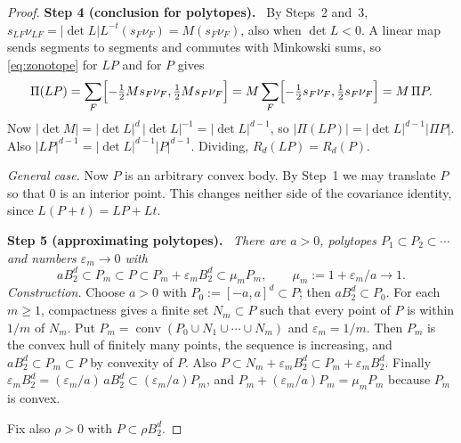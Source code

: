 \documentclass[11pt]{article}
\DeclareMathOperator{\conv}{conv}
\newcommand{\step}[1]{\par\smallskip\noindent\textbf{#1}\ }
\begin{document}
\begin{proof}
\step{Step 4 (conclusion for polytopes).} By Steps~2 and~3,
\(s_{LF}\nu_{LF}=|\det L|L^{-t}(s_F\nu_F)=M(s_F\nu_F)\), also when
\(\det L<0\). A linear map sends segments to segments and commutes with
Minkowski sums, so \eqref{eq:zonotope} for \(LP\) and for \(P\) gives
\[
 \Pi(LP)=\sum_F\Bigl[-\tfrac12Ms_F\nu_F,\tfrac12Ms_F\nu_F\Bigr]
 =M\sum_F\Bigl[-\tfrac12s_F\nu_F,\tfrac12s_F\nu_F\Bigr]=M\,\Pi P.
\]
Now \(|\det M|=|\det L|^d\,|\det L|^{-1}=|\det L|^{d-1}\), so
\(|\Pi(LP)|=|\det L|^{d-1}|\Pi P|\). Also
\(|LP|^{d-1}=|\det L|^{d-1}|P|^{d-1}\). Dividing, \(R_d(LP)=R_d(P)\).

\medskip\noindent\emph{General case.} Now \(P\) is an arbitrary convex
body. By Step~1 we may translate \(P\) so that \(0\) is an interior point.
This changes neither side of the covariance identity, since
\(L(P+t)=LP+Lt\).

\step{Step 5 (approximating polytopes).} \emph{There are \(a>0\),
polytopes \(P_1\subset P_2\subset\cdots\) and numbers \(\varepsilon_m\to0\)
with}
\begin{equation}\label{eq:sandwich}
 aB_2^d\subset P_m\subset P\subset P_m+\varepsilon_mB_2^d\subset\mu_mP_m,
 \qquad\mu_m:=1+\varepsilon_m/a\longrightarrow1.
\end{equation}
\emph{Construction.} Choose \(a>0\) with \(P_0:=[-a,a]^d\subset P\); then
\(aB_2^d\subset P_0\). For each \(m\ge1\), compactness gives a finite set
\(N_m\subset P\) such that every point of \(P\) is within \(1/m\) of
\(N_m\). Put \(P_m=\conv(P_0\cup N_1\cup\cdots\cup N_m)\) and
\(\varepsilon_m=1/m\). Then \(P_m\) is the convex hull of finitely many
points, the sequence is increasing, and \(aB_2^d\subset P_m\subset P\) by
convexity of \(P\). Also \(P\subset N_m+\varepsilon_mB_2^d\subset
P_m+\varepsilon_mB_2^d\). Finally
\(\varepsilon_mB_2^d=(\varepsilon_m/a)\,aB_2^d\subset(\varepsilon_m/a)P_m\),
and \(P_m+(\varepsilon_m/a)P_m=\mu_mP_m\) because \(P_m\) is convex.

Fix also \(\rho>0\) with \(P\subset\rho B_2^d\).


\end{proof}
\end{document}
